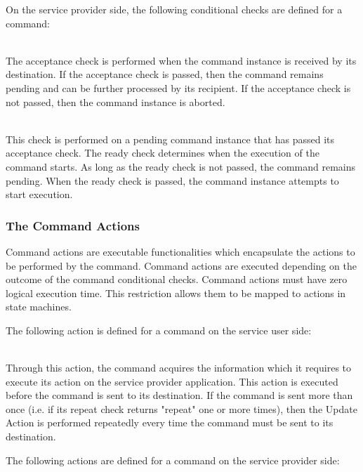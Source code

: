 On the service provider side, the following conditional checks are defined for a command:

\begin{fw_description}
\item[Acceptance Check]\hfill\\
The acceptance check is performed when the command instance is received by its destination. If the acceptance check is passed, then the command remains pending and can be further processed by its recipient. If the acceptance check is not passed, then the command instance is aborted.
\item[Ready Check]\hfill\\
This check is performed on a pending command instance that has passed its acceptance check. The ready check determines when the execution of the command starts.  As long as the ready check is not passed, the command remains pending. When the ready check is passed, the command instance attempts to start execution.
\end{fw_description}

\subsubsection{The Command Actions}\label{sec:CmdActions}
Command actions are executable functionalities which encapsulate the actions to be performed by the command. Command actions are executed depending on the outcome of the command conditional checks. Command actions must have zero logical execution time. This restriction allows them to be mapped to actions in state machines. 

The following action is defined for a command on the service user side:

\begin{fw_description}
\item[Update Action]\hfill\\
Through this action, the command acquires the information which it requires to execute its action on the service provider application. This action is executed before the command is sent to its destination. If the command is sent more than once (i.e. if its repeat check returns "repeat" one or more times), then the Update Action is performed repeatedly every time the command must be sent to its destination.
\end{fw_description} 

The following actions are defined for a command on the service provider side:

